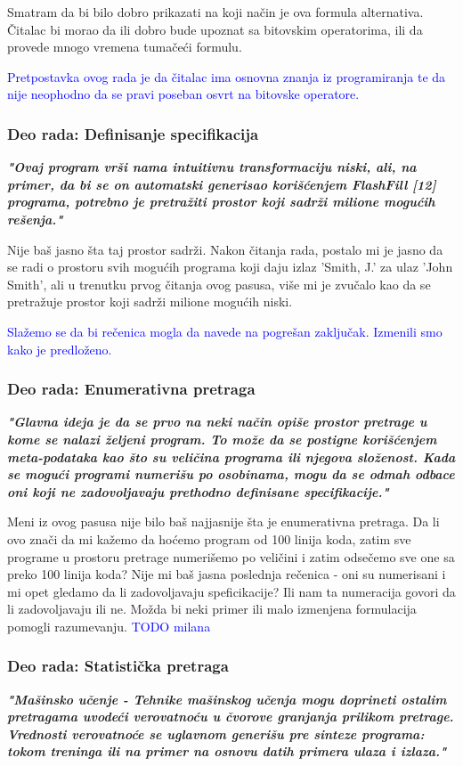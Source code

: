 \documentclass[a4paper]{report}
\newcommand{\odgovor}[1]{\textcolor{blue}{#1}}
\begin{document}
Smatram da bi bilo dobro prikazati na koji način je ova formula alternativa. Čitalac bi morao da ili dobro bude upoznat sa bitovskim operatorima, ili da provede mnogo vremena tumačeći formulu.

\odgovor {Pretpostavka ovog rada je da čitalac ima osnovna znanja iz programiranja te da nije neophodno da se pravi poseban osvrt na bitovske operatore.}

\subsubsection{Deo rada: Definisanje specifikacija}
\textbf{\textit{"Ovaj program vrši nama intuitivnu transformaciju niski, ali, na primer,
da bi se on automatski generisao korišćenjem FlashFill [12] programa, potrebno je pretražiti prostor koji sadrži milione mogućih rešenja."}}

Nije baš jasno šta taj prostor sadrži. Nakon čitanja rada, postalo mi je jasno da se radi o prostoru svih mogućih programa koji daju izlaz 'Smith, J.' za ulaz 'John Smith', ali u trenutku prvog čitanja ovog pasusa, više mi je zvučalo kao da se pretražuje prostor koji sadrži milione mogućih niski.

\odgovor {Slažemo se da bi rečenica mogla da navede na pogrešan zaključak. Izmenili smo kako je predloženo.}

\subsubsection{Deo rada: Enumerativna pretraga}
\textbf{\textit{"Glavna ideja je da se prvo na neki način opiše prostor pretrage u kome se nalazi željeni program. To može da se postigne korišćenjem meta-podataka kao što su veličina programa ili
njegova složenost. Kada se mogući programi numerišu po osobinama, mogu da se odmah odbace oni koji ne zadovoljavaju prethodno definisane specifikacije."}}

Meni iz ovog pasusa nije bilo baš najjasnije šta je enumerativna pretraga. Da li ovo znači da mi kažemo da hoćemo program od 100 linija koda, zatim sve programe u prostoru pretrage numerišemo po veličini i zatim odsečemo sve one sa preko 100 linija koda? Nije mi baš jasna poslednja rečenica - oni su numerisani i mi opet gledamo da li zadovoljavaju speficikacije? Ili nam ta numeracija govori da li zadovoljavaju ili ne. Možda bi neki primer ili malo izmenjena formulacija pomogli razumevanju.
\odgovor {TODO milana}


\subsubsection{Deo rada: Statistička pretraga}
\textbf{\textit{"Mašinsko učenje - Tehnike mašinskog učenja mogu doprineti ostalim pretragama uvodeći verovatnoću u čvorove granjanja prilikom pretrage. Vrednosti verovatnoće se uglavnom generišu pre sinteze programa: tokom treninga ili na primer na osnovu datih primera ulaza i izlaza."}}
\end{document}
